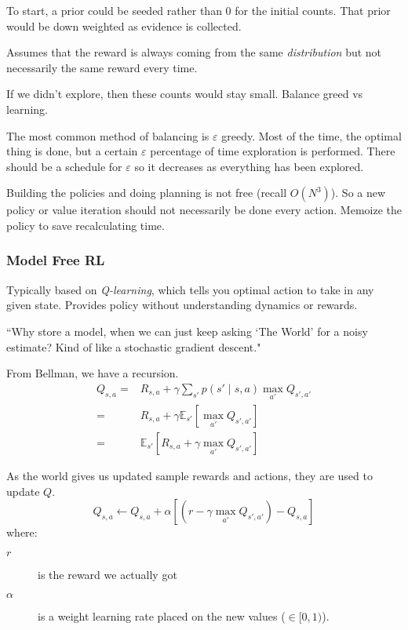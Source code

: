 \documentclass[11pt, oneside]{article}   	%
\begin{document}
To start, a prior could be seeded rather than 0 for the initial counts. That prior would be down weighted as evidence is collected.

Assumes that the reward is always coming from the same \emph{distribution} but not necessarily the same reward every time.

If we didn't explore, then these counts would stay small. Balance greed vs learning.

The most common method of balancing is $\varepsilon$ greedy. Most of the time, the optimal thing is done, but a certain $\varepsilon$ percentage of time exploration is performed. There should be a schedule for $\varepsilon$ so it decreases as everything has been explored.

Building the policies and doing planning is not free (recall $O(N^3)$). So a new policy or value iteration should not necessarily be done every action. Memoize the policy to save recalculating time.

\subsubsection{Model Free RL}

Typically based on \emph{Q-learning}, which tells you optimal action to take in any given state. Provides policy without understanding dynamics or rewards.

``Why store a model, when we can just keep asking `The World' for a noisy estimate? Kind of like a stochastic gradient descent."

From Bellman, we have a recursion.
\begin{align}
Q_{s,a} = &R_{s,a} + \gamma \sum_{s'} p(s' \mid s,a) \max_{a'} Q_{s',a'}\\
	      = & R_{s,a} + \gamma \mathbb{E}_{s'} \left[ \max_{a'} Q_{s',a'}\right]\\
	      = & \mathbb{E}_{s'} \left[ R_{s,a} + \gamma \max_{a'} Q_{s',a'}\right]
\end{align}

As the world gives us updated sample rewards and actions, they are used to update $Q$.
\begin{equation}
	Q_{s,a} \leftarrow Q_{s,a} + \alpha \left[ (r - \gamma \max_{a'} Q_{s',a'}) - Q_{s,a}\right]
\end{equation}
where:
\begin{description}
	\item[$r$] is the reward we actually got
	\item[$\alpha$] is a weight learning rate placed on the new values ($\in [0,1)$).
\end{description}
\end{document}
